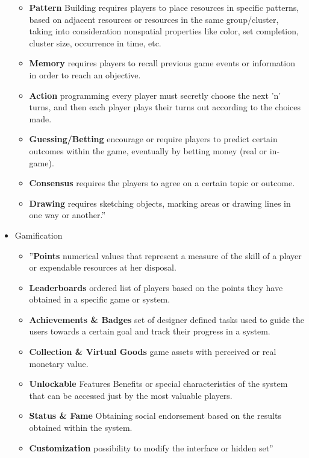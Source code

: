 \documentclass{article}
\theoremstyle{definition}
\theoremstyle{remark}
\begin{document}
\begin{itemize}
\begin{itemize}
        \item \textbf{Pattern} Building requires players to place resources in specific patterns, based on adjacent resources or resources in the same group/cluster, taking into consideration nonspatial properties like color, set completion, cluster size, occurrence in time, etc.
        \item \textbf{Memory} requires players to recall previous game events or information in order to reach an objective.
        \item \textbf{Action} programming every player must secretly choose the next ’n’ turns, and then each player plays their turns out according to the choices made.
        \item \textbf{Guessing/Betting} encourage or require players to predict certain outcomes within the game, eventually by betting money (real or in-game).
        \item \textbf{Consensus} requires the players to agree on a certain topic or outcome.
        \item \textbf{Drawing} requires sketching objects, marking areas or drawing lines in one way or another.'' \cite{information_retrieval}
    \end{itemize}
    
    \item Gamification
    \begin{itemize}
        \item ''\textbf{Points} numerical values that represent a measure of the skill of a player or expendable resources at her disposal.
        \item \textbf{Leaderboards} ordered list of players based on the points they have obtained in a specific game or system.
        \item \textbf{Achievements \& Badges} set of designer defined tasks used to guide the users towards a certain goal and track their progress in a system.
        \item \textbf{Collection \& Virtual Goods} game assets with perceived or real monetary value.
        \item \textbf{Unlockable} Features Benefits or special characteristics of the system that can be accessed just by the most valuable players.
        \item \textbf{Status \& Fame} Obtaining social endorsement based on the results obtained within the system.
        \item \textbf{Customization} possibility to modify the interface or hidden set'' \cite{information_retrieval}
    \end{itemize}


\end{itemize}
\end{document}
